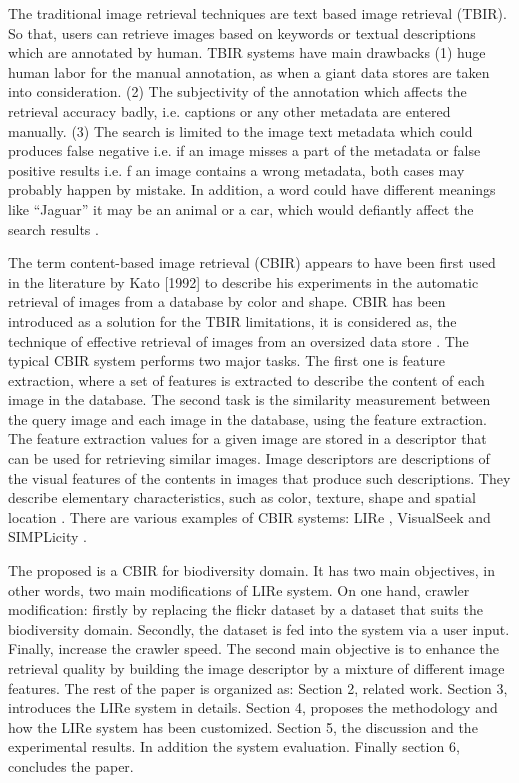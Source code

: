 \documentclass[11pt]{article}
\begin{document}
The traditional image retrieval techniques are text based image retrieval (TBIR). So that, users can retrieve images based on keywords or textual descriptions which are annotated by human. TBIR systems have main drawbacks (1) huge human labor for the manual annotation, as when a giant data stores are taken into consideration. (2) The subjectivity of the annotation which affects the retrieval accuracy badly, i.e. captions or any other metadata are entered manually. (3) The search is limited to the image text metadata which could produces false negative i.e. if an image misses a part of the metadata or false positive results i.e. f an image contains a wrong metadata, both cases may probably happen by mistake. In addition, a word could have different meanings like “Jaguar” it may be an animal or a car, which would defiantly affect the search results \cite{alzu2015semantic, won2002efficient, jalab2011image, srinivas2015content}.

The term content-based image retrieval (CBIR) appears to have been first used in the literature by Kato [1992] to describe his experiments in the automatic retrieval of images from a database by color and shape. \cite{jalab2011image} CBIR has been introduced as a solution for the TBIR limitations, it is considered as, the technique of effective retrieval of images from an oversized data store \cite{alzu2015semantic, won2002efficient, jalab2011image, srinivas2015content}. The typical CBIR system performs two major tasks. The first one is feature extraction, where a set of features is extracted to describe the content of each image in the database. The second task is the similarity measurement between the query image and each image in the database, using the feature extraction. The feature extraction values for a given image are stored in a descriptor that can be used for retrieving similar images. Image descriptors are descriptions of the visual features of the contents in images that produce such descriptions. They describe elementary characteristics, such as color, texture, shape and spatial location \cite{jalab2011image}. There are various examples of CBIR systems: LIRe \cite{lux2011content}, VisualSeek \cite{smith1997visualseek} and SIMPLicity \cite{wang2001simplicity}.

The proposed is a CBIR for biodiversity domain. It has two main objectives, in other words, two main modifications of LIRe system. On one hand, crawler modification: firstly by replacing the flickr dataset by a dataset that suits the biodiversity domain. Secondly, the dataset is fed into the system via a user input. Finally, increase the crawler speed. The second main objective is to enhance the retrieval quality by building the image descriptor by a mixture of different image features. The rest of the paper is organized as: Section 2, related work. Section 3, introduces the LIRe system in details. Section 4, proposes the methodology and how the LIRe system has been customized. Section 5, the discussion and the experimental results. In addition the system evaluation. Finally section 6, concludes the paper.
\end{document}
